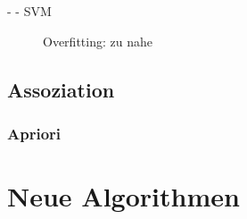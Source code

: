 \documentclass[fleqn,11pt,aspectratio=43]{beamer}
\begin{document}
\begin{frame}{\insertsectionhead - \insertsubsectionhead - SVM}
\begin{figure}
\scalebox{1.1}{}
\caption{Overfitting: zu nahe}
\end{figure}
\end{frame}

%
%

\subsection{Assoziation}	
\subsubsection{Apriori}\label{apriori}
\section{Neue Algorithmen~}

\end{document}
